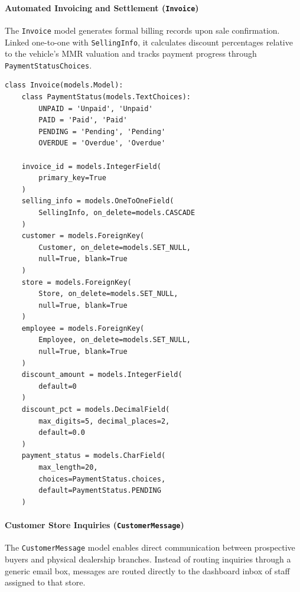 \paragraph{Automated Invoicing and Settlement (\texttt{Invoice})}
The \texttt{Invoice} model generates formal billing records upon sale confirmation. Linked one-to-one with \texttt{SellingInfo}, it calculates discount percentages relative to the vehicle's MMR valuation and tracks payment progress through \texttt{PaymentStatusChoices}.

\begin{tcolorbox}[title=\textbf{Listing 5.5: Financial Settlement Model (\texttt{Invoice})}, colback=gray!4, colframe=indigo!70!black, arc=2pt, boxrule=0.6pt, left=6pt, right=6pt, top=4pt, bottom=4pt]
\footnotesize
\begin{verbatim}
class Invoice(models.Model):
    class PaymentStatus(models.TextChoices):
        UNPAID = 'Unpaid', 'Unpaid'
        PAID = 'Paid', 'Paid'
        PENDING = 'Pending', 'Pending'
        OVERDUE = 'Overdue', 'Overdue'

    invoice_id = models.IntegerField(
        primary_key=True
    )
    selling_info = models.OneToOneField(
        SellingInfo, on_delete=models.CASCADE
    )
    customer = models.ForeignKey(
        Customer, on_delete=models.SET_NULL,
        null=True, blank=True
    )
    store = models.ForeignKey(
        Store, on_delete=models.SET_NULL,
        null=True, blank=True
    )
    employee = models.ForeignKey(
        Employee, on_delete=models.SET_NULL,
        null=True, blank=True
    )
    discount_amount = models.IntegerField(
        default=0
    )
    discount_pct = models.DecimalField(
        max_digits=5, decimal_places=2,
        default=0.0
    )
    payment_status = models.CharField(
        max_length=20,
        choices=PaymentStatus.choices,
        default=PaymentStatus.PENDING
    )
\end{verbatim}
\end{tcolorbox}

\paragraph{Customer Store Inquiries (\texttt{CustomerMessage})}
The \texttt{CustomerMessage} model enables direct communication between prospective buyers and physical dealership branches. Instead of routing inquiries through a generic email box, messages are routed directly to the dashboard inbox of staff assigned to that store.

